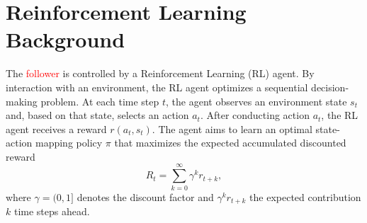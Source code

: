 \documentclass[review]{elsarticle}
\providecommand{\red}[1]{\textcolor{red}{#1}}
\providecommand{\martin}[1]{\red{#1}} %
\providecommand{\3}{{\ss}}
\begin{document}
\section{Reinforcement Learning Background}
\label{sec:RLBackground}

The \martin{follower} is controlled by a Reinforcement
Learning (RL) agent. By interaction with an environment, the RL agent
optimizes a sequential decision-making problem. At each time step
$t$, the agent observes an environment state $s_t$ and, based on that state, selects
an action $a_t$. After conducting action $a_t$, the RL agent receives
a reward $r(a_t,s_t)$. The agent aims to learn an optimal state-action
mapping policy $\pi$ that maximizes the expected accumulated
discounted reward
\begin{equation}
\label{Rt}
R_{t}=\sum_{k=0}^{\infty} \gamma^{k} r_{t+k},
\end{equation}
 where $\gamma = (0,1]$ denotes the discount factor and 
$\gamma^k r_{t+k}$ the expected contribution $k$ time steps ahead. 
\end{document}

